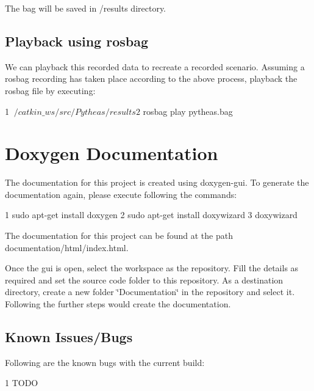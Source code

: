 

The bag will be saved in /results directory.

\subsection*{Playback using rosbag}

We can playback this recorded data to recreate a recorded scenario. Assuming a rosbag recording has taken place according to the above process, playback the rosbag file by executing\+:


\begin{DoxyCode}
1 $ ~/catkin\_ws/src/Pytheas/results
2 $ rosbag play pytheas.bag
\end{DoxyCode}


\section*{Doxygen Documentation}

The documentation for this project is created using doxygen-\/gui. To generate the documentation again, please execute following the commands\+:


\begin{DoxyCode}
1 sudo apt-get install doxygen
2 sudo apt-get install doxywizard
3 doxywizard
\end{DoxyCode}


The documentation for this project can be found at the path documentation/html/index.\+html.

Once the gui is open, select the workspace as the repository. Fill the details as required and set the source code folder to this repository. As a destination directory, create a new folder \char`\"{}\+Documentation\char`\"{} in the repository and select it. Following the further steps would create the documentation.

\subsection*{Known Issues/\+Bugs}

Following are the known bugs with the current build\+: 
\begin{DoxyCode}
1 TODO
\end{DoxyCode}
 